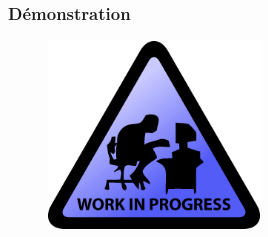  \begin{frame}
   \frametitle{Démonstration}
   \begin{figure}
   \includegraphics[width=0.5\textwidth]{Fig/workInProgress.png}
   \end{figure}

 \end{frame}
